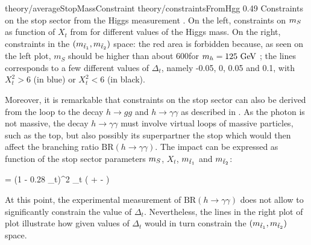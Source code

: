                          {theory/averageStopMassConstraint}
                         {theory/constraintsFromHgg}
                         {0.49}
                         {Constraints on the stop sector from the Higgs measurement \cite{TheLightStopWindow}.
                         On the left, constraints on $m_{S}$ as function of $X_t$ from
                         for different values of the Higgs mass. On the right, constraints
                         in the $(m_{\tilde{t}_1},m_{\tilde{t}_2})$ space: the
                         red area is forbidden because, as seen on the left plot, $m_S$
                         should be higher than about 600\GeV for $m_{h} = 125~\text{GeV}$ ;
                         the lines corresponds to a few different values of $\Delta_t$,
                         namely -0.05, 0, 0.05 and 0.1, with $X_t^2 > 6$ (in blue) or
                         $X_t^2 < 6$ (in black).
                         }

        Moreover, it is remarkable that constraints on the stop sector can also be derived
        from the loop to the decay $h \rightarrow gg$ and $h \rightarrow \gamma \gamma$
        as described in \cite{TheLightStopWindow}. As the photon is not massive,
        the decay $h \rightarrow \gamma \gamma$ must involve virtual loops of massive
        particles, such as the top, but also possibly its superpartner the stop which
        would then affect the branching ratio $\text{BR}(h \rightarrow \gamma\gamma)$.
        The impact can be expressed as function of the stop sector parameters $m_{S}$,
        $X_t$, $m_{\tilde{t}_1}$ and $m_{\tilde{t}_2}$:

        {
            =
            (1 - 0.28 \Delta_t)^2
            \hspace*{0.5cm}
            \hspace*{0.5cm}
            \Delta_t
            \approx
            \left(
                +
                -
            \right)
        }

        At this point, the experimental measurement of $\text{BR}(h\rightarrow\gamma\gamma)$
        does not allow to significantly constrain the value of $\Delta_t$. Nevertheless,
        the lines in the right plot of  plot illustrate
        how given values of $\Delta_t$ would in turn constrain the
        $(m_{\tilde{t}_1},m_{\tilde{t}_2})$ space.

